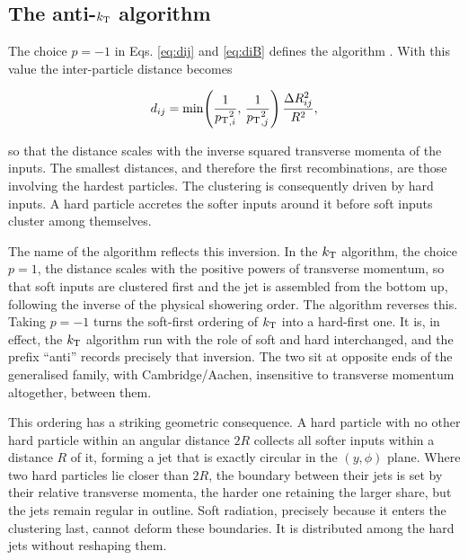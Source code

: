 \subsection{The anti-$k_{\mathrm{T}}$ algorithm}
\label{sec:antikt}

The choice $p = -1$ in Eqs. \eqref{eq:dij} and \eqref{eq:diB} defines the \antikt{}
algorithm \cite{Cacciari_2008}. With this value the inter-particle distance becomes

\begin{equation}
  d_{ij} = \min\!\left( \frac{1}{p_{\mathrm{T}}{}_{,i}^{2}},\, \frac{1}{p_{\mathrm{T}}{}_{,j}^{2}} \right)
           \frac{\Delta R_{ij}^2}{R^2},
  \label{eq:antikt-distance}
\end{equation}

so that the distance scales with the inverse squared transverse momenta of
the inputs. The smallest distances, and therefore the first recombinations,
are those involving the hardest particles. The clustering is consequently driven
by hard inputs. A hard particle accretes the softer inputs around it before soft
inputs cluster among themselves.

The name of the algorithm reflects this inversion. In the $k_{\mathrm{T}}$ algorithm, the
choice $p = 1$, the distance scales with the positive powers of transverse
momentum, so that soft inputs are clustered first and the jet is assembled from
the bottom up, following the inverse of the physical showering order. The
\antikt{} algorithm reverses this. Taking $p = -1$ turns the soft-first ordering
of $k_{\mathrm{T}}$ into a hard-first one. It is, in effect, the $k_{\mathrm{T}}$ algorithm run with the
role of soft and hard interchanged, and the prefix ``anti'' records precisely that
inversion. The two sit at opposite ends of the generalised family, with
Cambridge/Aachen, insensitive to transverse momentum altogether, between them.

This ordering has a striking geometric consequence. A hard particle with no other
hard particle within an angular distance $2R$ collects all softer inputs within a
distance $R$ of it, forming a jet that is exactly circular in the $(y,\phi)$
plane. Where two hard particles lie closer than $2R$, the boundary between their
jets is set by their relative transverse momenta, the harder one retaining the
larger share, but the jets remain regular in outline. Soft radiation, precisely
because it enters the clustering last, cannot deform these boundaries. It is
distributed among the hard jets without reshaping them.

